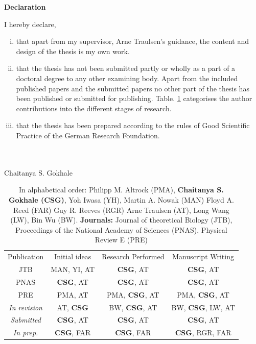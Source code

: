 \documentclass[oneside,11pt,a4paper]{book}
\begin{document}
\normalsize
\newpage
\thispagestyle{plain}
\renewcommand{\thepage}{\roman{page}}
\begin{center}
\Large{\textbf{Declaration}}
\end{center}
\small
I hereby declare,
\begin{enumerate}[i.]
\item that apart from my supervisor, Arne Traulsen's guidance, the content and design of the thesis is my own work. 
\item that the thesis has not been submitted partly or wholly as a part of a doctoral degree to any other examining body.
Apart from the included published papers and the submitted papers no other part of the thesis has been published or submitted for publishing.
Table. \ref{tab:contributions} categorises the author contributions into the different stages of research.
\item that the thesis has been prepared according to the rules of Good Scientific Practice of the German Research Foundation.
\end{enumerate}
\noindent
\\ 
\\
Chaitanya S. Gokhale
%
\begin{table}[h]
\begin{center}
\caption{
\label{tab:contributions}
\footnotesize{In alphabetical order:
Philipp M. Altrock (PMA),
\textbf{Chaitanya S. Gokhale (CSG)},
Yoh Iwasa (YH),
Martin A. Nowak (MAN)
Floyd A. Reed (FAR)
Guy R. Reeves (RGR)
Arne Traulsen (AT),
Long Wang (LW),
Bin Wu (BW).
\textbf{Journals:}
Journal of theoretical Biology (JTB),
Proceedings of the National Academy of Sciences (PNAS),
Physical Review E (PRE)}}
\begin{tabular}{cccc}
\vspace{0.01cm}
\\
\hline 
\hline
\small Publication
 &\small  Initial ideas &\small  Research Performed &\small  Manuscript Writing \\
 \hline
\small JTB & \small MAN, YI, AT &\small  \textbf{CSG}, AT &\small  \textbf{CSG}, AT  \\
\small PNAS &\small  \textbf{CSG}, AT &\small  \textbf{CSG}, AT &\small  \textbf{CSG}, AT \\
\small PRE &\small  PMA, AT &\small  PMA, \textbf{CSG}, AT &\small  PMA, \textbf{CSG}, AT  \\
\small \textit{In revision} & \small AT, \textbf{CSG} &\small  BW, \textbf{CSG}, AT &\small  BW, \textbf{CSG}, LW, AT  \\
\small \textit{Submitted} &\small  \textbf{CSG}, AT &\small  \textbf{CSG}, AT &\small  \textbf{CSG}, AT \\
\small \textit{In prep.} &\small  \textbf{CSG}, FAR \small &\small  \textbf{CSG}, FAR &\small  \textbf{CSG}, RGR, FAR \\
\hline
\hline
\end{tabular}
\end{center}
\end{table}
\end{document}
